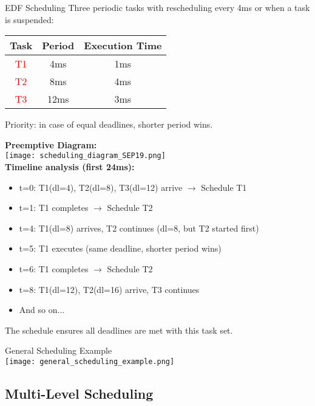 \begin{example2}{EDF Scheduling}
    Three periodic tasks with rescheduling every 4ms or when a task is suspended: 
    
    \begin{tabular}{|c|c|c|}
        \hline
        Task & Period & Execution Time \\
        \hline
        \textcolor{red}{T1} & 4ms & 1ms \\
        \textcolor{red}{T2} & 8ms & 4ms \\
        \textcolor{red}{T3} & 12ms & 3ms \\
        \hline
    \end{tabular}

    Priority: in case of equal deadlines, shorter period wins.

    \tcblower
    \textbf{Preemptive Diagram:}\\
    \texttt{[image: scheduling\_diagram\_SEP19.png]}
    \vspace{2mm}\\
    \textbf{Timeline analysis (first 24ms):}
    \begin{itemize}
        \item t=0: T1(dl=4), T2(dl=8), T3(dl=12) arrive $\rightarrow$ Schedule T1
        \item t=1: T1 completes $\rightarrow$ Schedule T2  
        \item t=4: T1(dl=8) arrives, T2 continues (dl=8, but T2 started first)
        \item t=5: T1 executes (same deadline, shorter period wins)
        \item t=6: T1 completes $\rightarrow$ Schedule T2
        \item t=8: T1(dl=12), T2(dl=16) arrive, T3 continues
        \item And so on...
    \end{itemize}
    
    The schedule ensures all deadlines are met with this task set.
\end{example2}

\begin{example2}{General Scheduling Example}\\
    \texttt{[image: general\_scheduling\_example.png]}
\end{example2}

\subsection{Multi-Level Scheduling}

